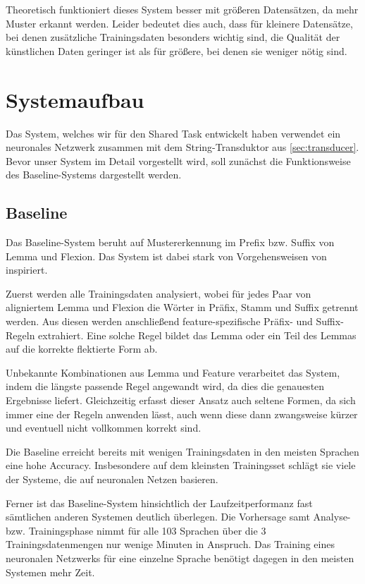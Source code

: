 \documentclass[11pt,a4paper]{article}
\begin{document}
Theoretisch funktioniert dieses System besser mit größeren Datensätzen, da mehr Muster erkannt werden. Leider bedeutet dies auch, dass für kleinere Datensätze, bei denen zusätzliche Trainingsdaten besonders wichtig sind, die Qualität der künstlichen Daten geringer ist als für größere, bei denen sie weniger nötig sind.

\section{Systemaufbau}
\label{sec:architecture}
Das System, welches wir für den Shared Task entwickelt haben verwendet ein neuronales Netzwerk zusammen mit dem String-Transduktor aus \autoref{sec:transducer}. Bevor unser System im Detail vorgestellt wird, soll zunächst die Funktionsweise des Baseline-Systems dargestellt werden.

\subsection{Baseline}
\label{sec:baseline}
Das Baseline-System beruht auf Mustererkennung im Prefix bzw. Suffix von Lemma und Flexion. Das System ist dabei stark von Vorgehensweisen von \citet{baseline:Ling2016} inspiriert.

Zuerst werden alle Trainingsdaten analysiert, wobei für jedes Paar von aligniertem Lemma und Flexion die Wörter in Präfix, Stamm und Suffix getrennt werden. Aus diesen werden anschließend feature-spezifische Präfix- und Suffix-Regeln extrahiert. Eine solche Regel bildet das Lemma oder ein Teil des Lemmas auf die korrekte flektierte Form ab.

Unbekannte Kombinationen aus Lemma und Feature verarbeitet das System, indem die längste passende Regel angewandt wird, da dies die genauesten Ergebnisse liefert. Gleichzeitig erfasst dieser Ansatz auch seltene Formen, da sich immer eine der Regeln anwenden lässt, auch wenn diese dann zwangsweise kürzer und eventuell nicht vollkommen korrekt sind.

Die Baseline erreicht bereits mit wenigen Trainingsdaten in den meisten Sprachen eine hohe Accuracy. Insbesondere auf dem kleinsten Trainingsset schlägt sie viele der Systeme, die auf neuronalen Netzen basieren.

Ferner ist das Baseline-System hinsichtlich der Laufzeitperformanz fast sämtlichen anderen Systemen deutlich überlegen. Die Vorhersage samt Analyse- bzw. Trainingsphase nimmt für alle 103 Sprachen über die 3 Trainingsdatenmengen nur wenige Minuten in Anspruch. Das Training eines neuronalen Netzwerks für eine einzelne Sprache benötigt dagegen in den meisten Systemen mehr Zeit.
\end{document}

